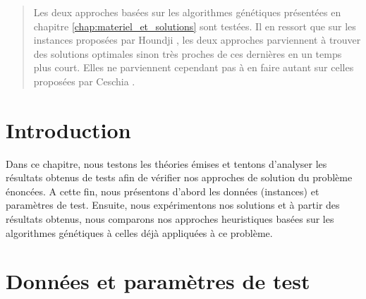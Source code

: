 \begin{abstract}
	Les deux approches basées sur les algorithmes génétiques présentées en chapitre \ref{chap:materiel_et_solutions} sont testées. Il en ressort que sur les instances proposées par Houndji \cite{houndji_thesis}, les deux approches parviennent à trouver des solutions optimales sinon très proches de ces dernières en un temps plus court. Elles ne parviennent cependant pas à en faire autant sur celles proposées par Ceschia \cite{ceschia}.
\end{abstract}

\section*{Introduction}
		Dans ce chapitre, nous testons les théories émises et tentons d'analyser les résultats obtenus de tests afin de vérifier nos approches de solution du problème énoncées. A cette fin, nous présentons d'abord les données (instances) et paramètres de test. Ensuite, nous expérimentons nos solutions et à partir des résultats obtenus, nous comparons nos approches heuristiques basées sur les algorithmes génétiques à celles déjà appliquées à ce problème.
		
\section{Données et paramètres de test}
